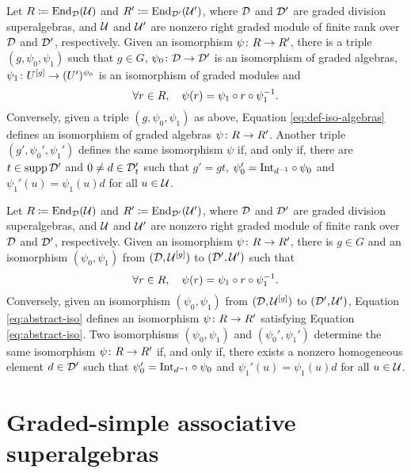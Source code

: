 \begin{thm}\label{thm:iso-abstract}
    Let $R \coloneqq \operatorname{End}_{\mathcal{D}}(\mathcal U)$ and $R' \coloneqq \operatorname{End}_{\mathcal{D}'}(\mathcal U')$, where $\mathcal{D}$ and $\mathcal{D}'$ are graded division superalgebras, and $\mathcal U$ and $\mathcal U'$ are nonzero right graded module of finite rank over $\mathcal{D}$ and $\mathcal{D}'$, respectively. 
    Given an isomorphism $\psi\colon R \to R'$, there is a triple $(g, \psi_0, \psi_1)$ such that $g \in G$, $\psi_0\colon \mathcal{D} \to \mathcal{D}'$ is an isomorphism of graded algebras, $\psi_1\colon U^{[g]} \to (U')^{\psi_0}$ is an isomorphism of graded modules and 
    \begin{equation}\label{eq:def-iso-algebras}
            \forall r\in R, \quad \psi(r) = \psi_1 \circ r \circ \psi_1^{-1}.
    \end{equation}
    Conversely, given a triple $(g, \psi_0, \psi_1)$ as above, Equation \eqref{eq:def-iso-algebras} defines an isomorphism of graded algebras $\psi\colon R \to R'$. 
    Another triple $(g', \psi_0', \psi_1')$ defines the same isomorphism $\psi$ if, and only if, there are $t\in \operatorname{supp} \mathcal{D}'$ and $0 \neq d\in \mathcal{D}'_t$ such that $g'= gt$, $\psi_0' = \mathrm{Int}_{d^{-1}} \circ \psi_0$ and $\psi_1' (u) = \psi_1 (u) d$ for all $u \in \mathcal U$.
\end{thm}

\begin{thm}\label{thm:iso-abstract}
    Let $R \coloneqq \operatorname{End}_{\mathcal{D}}(\mathcal U)$ and $R' \coloneqq \operatorname{End}_{\mathcal{D}'}(\mathcal U')$, where $\mathcal{D}$ and $\mathcal{D}'$ are graded division superalgebras, and $\mathcal U$ and $\mathcal U'$ are nonzero right graded module of finite rank over $\mathcal{D}$ and $\mathcal{D}'$, respectively. 
    Given an isomorphism $\psi\colon R \to R'$, there is $g \in G$ and an isomorphism $(\psi_0, \psi_1)$ from $(\mathcal{D}, \mathcal U^{[g]})$ to $(\mathcal{D}', \mathcal U')$ such that
    \begin{equation}\label{eq:abstract-iso}
        \forall r\in R, \quad \psi(r) = \psi_1 \circ r \circ \psi_1^{-1}.
    \end{equation}
    Conversely, given an isomorphism $(\psi_0, \psi_1)$ from $(\mathcal{D}, \mathcal U^{[g]})$ to $(\mathcal{D}', \mathcal U')$, Equation \eqref{eq:abstract-iso} defines an isomorphism $\psi\colon R \to R'$ satisfying Equation \eqref{eq:abstract-iso}. 
    Two isomorphisms $(\psi_0, \psi_1)$ and $(\psi_0', \psi_1')$ determine the same isomorphism $\psi\colon R \to R'$ if, and only if, there exists a nonzero homogeneous element $d\in \mathcal{D}'$ such that $\psi_0' = \mathrm{Int}_{d^{-1}} \circ \psi_0$ and $\psi_1' (u) = \psi_1 (u) d$ for all $u \in \mathcal U$.
\end{thm}


\section{Graded-simple associative superalgebras}

